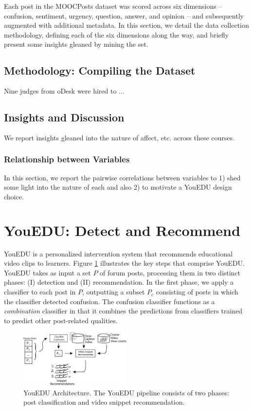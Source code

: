 \documentclass{edm_template}
\begin{document}
Each post in the MOOCPosts dataset was scored across six dimensions -- confusion, sentiment, urgency, question, answer, and opinion -- and subsequently augmented with additional metadata. In this section, we detail the data collection methodology, defining each of the six dimensions along the way, and briefly present some insights gleaned by mining the set.


\subsection{Methodology: Compiling the Dataset}
Nine judges from oDesk were hired to ...

\subsection{Insights and Discussion}
We report insights gleaned into the nature of affect, etc. across these courses.

\subsubsection{Relationship between Variables}
In this section, we report the pairwise correlations between variables to 1) shed some light into the nature of each and also 2) to motivate a YouEDU design choice.

\section{YouEDU: Detect and Recommend}

YouEDU is a personalized intervention system that recommends educational video clips to learners. Figure \ref{figure:architecture} illustrates the key steps that comprise YouEDU. YouEDU takes as input a set $P$ of forum posts, processing them in two distinct phases: (I) detection and (II) recommendation. In the first phase, we apply a classifier to each post in $P$, outputting a subset $P_{c}$ consisting of posts in which the classifier detected confusion. The confusion classifier functions as a \emph{combination} classifier in that it combines the predictions from classifiers trained to predict other post-related qualities.

\begin{figure}[ht]
       \centering
       \includegraphics[width=0.5\textwidth]{../Figs/youEduArch.png}
       \caption{\textnormal{YouEDU Architecture. The YouEDU pipeline consists of two phases: post classification and video snippet recommendation.}}
       \label{figure:architecture}
\end{figure}
\end{document}
